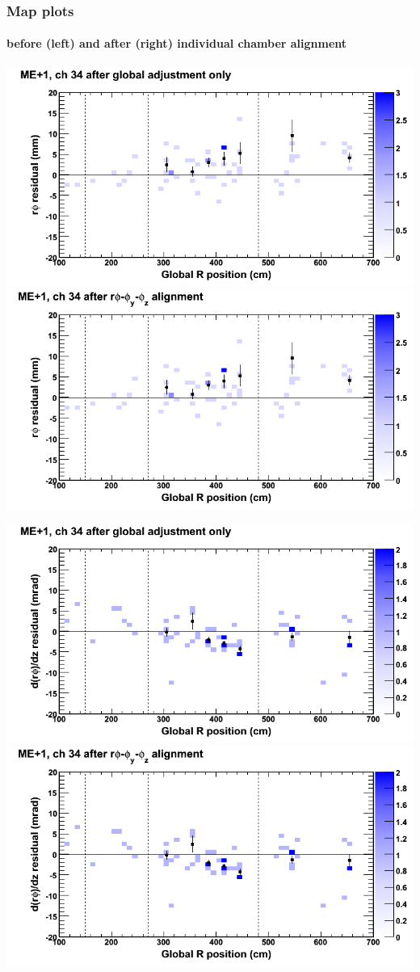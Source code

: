 \documentclass[compress]{beamer}
\begin{document}
\begin{frame}
\frametitle{Map plots}
\framesubtitle{before (left) and after (right) individual chamber alignment}
\includegraphics[width=0.5\linewidth]{ringmapplots_3dof/before_CSCvsr_mep1ch34_x.png} \includegraphics[width=0.5\linewidth]{ringmapplots_3dof/after_CSCvsr_mep1ch34_x.png}

\includegraphics[width=0.5\linewidth]{ringmapplots_3dof/before_CSCvsr_mep1ch34_dxdz.png} \includegraphics[width=0.5\linewidth]{ringmapplots_3dof/after_CSCvsr_mep1ch34_dxdz.png}
\end{frame}
\end{document}
